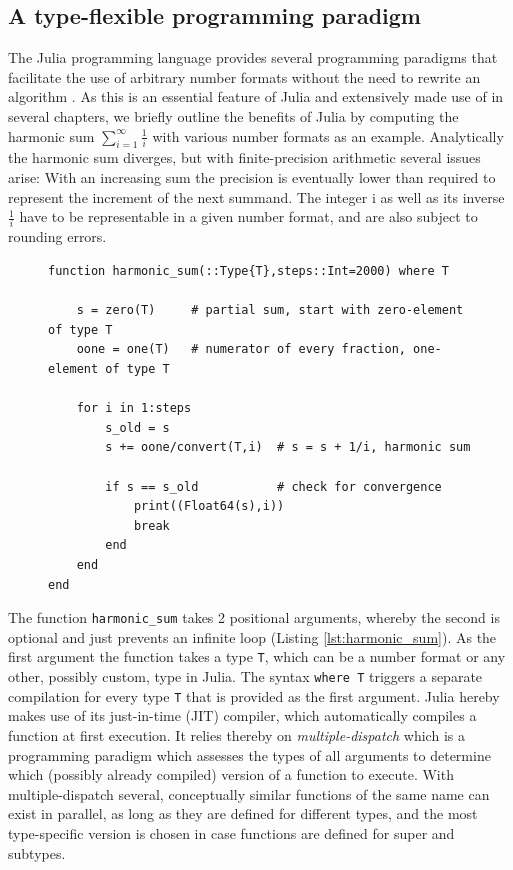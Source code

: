\subsection{A type-flexible programming paradigm}

The Julia programming language provides several programming paradigms that facilitate the use of arbitrary number formats
without the need to rewrite an algorithm \citep{Bezanson2017}. As this is an essential feature of Julia and extensively made 
use of in several chapters, we briefly outline the benefits of Julia by computing the harmonic sum
$\sum_{i=1}^\infty \tfrac{1}{i}$ with various number formats as an example. Analytically the harmonic sum diverges, but with
finite-precision arithmetic several issues arise: With an increasing sum the precision is eventually lower than required to
represent the increment of the next summand. The integer i as well as its inverse $\tfrac{1}{i}$ have to be representable
in a given number format, and are also subject to rounding errors.

\begin{figure}[tbhp]
\begin{lstlisting}[language=JuliaLocal, label=lst:harmonic_sum, caption={\textbf{A type-flexible function calculating the harmonic sum in Julia.}
The number format is passed on as type in the first argument. The syntax \texttt{where T} triggers a separate compilation for every number
format. The function \texttt{harmonic\_sum} is type-stable as all types inside the function are declared and therefore unambiguous to the
compiler.}]
function harmonic_sum(::Type{T},steps::Int=2000) where T

    s = zero(T)     # partial sum, start with zero-element of type T
    oone = one(T)   # numerator of every fraction, one-element of type T

    for i in 1:steps
        s_old = s
        s += oone/convert(T,i)  # s = s + 1/i, harmonic sum

        if s == s_old           # check for convergence
            print((Float64(s),i))
            break
        end
    end
end
\end{lstlisting}
\end{figure}

The function \texttt{harmonic\_sum} takes 2 positional arguments, whereby the second is optional and just prevents an
infinite loop (Listing \ref{lst:harmonic_sum}). As the first argument the function takes a type \texttt{T}, which can be a
number format or any other, possibly custom, type in Julia. The syntax \texttt{where T} triggers a separate compilation
for every type \texttt{T} that is provided as the first argument. Julia hereby makes use of its just-in-time (JIT) compiler,
which automatically compiles a function at first execution. It relies thereby on \emph{multiple-dispatch} which is a
programming paradigm which assesses the types of all arguments to determine which (possibly already compiled)
version of a function to execute. With multiple-dispatch several, conceptually similar functions
of the same name can exist in parallel, as long as they are defined for different types, and the most
type-specific version is chosen in case functions are defined for super and subtypes.

